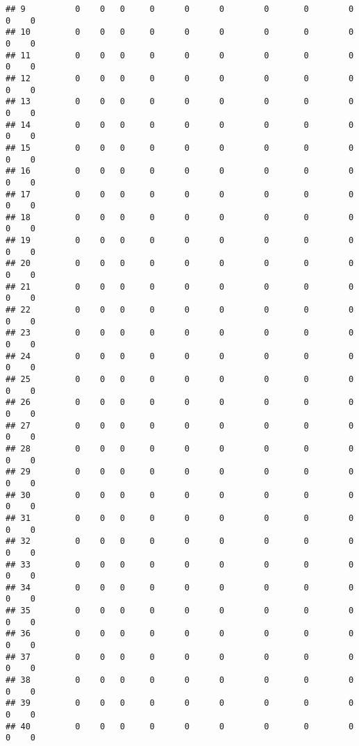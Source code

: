 \documentclass[
]{article}
\begin{document}
\begin{verbatim}
## 9          0    0   0     0      0      0        0       0        0     0    0
## 10         0    0   0     0      0      0        0       0        0     0    0
## 11         0    0   0     0      0      0        0       0        0     0    0
## 12         0    0   0     0      0      0        0       0        0     0    0
## 13         0    0   0     0      0      0        0       0        0     0    0
## 14         0    0   0     0      0      0        0       0        0     0    0
## 15         0    0   0     0      0      0        0       0        0     0    0
## 16         0    0   0     0      0      0        0       0        0     0    0
## 17         0    0   0     0      0      0        0       0        0     0    0
## 18         0    0   0     0      0      0        0       0        0     0    0
## 19         0    0   0     0      0      0        0       0        0     0    0
## 20         0    0   0     0      0      0        0       0        0     0    0
## 21         0    0   0     0      0      0        0       0        0     0    0
## 22         0    0   0     0      0      0        0       0        0     0    0
## 23         0    0   0     0      0      0        0       0        0     0    0
## 24         0    0   0     0      0      0        0       0        0     0    0
## 25         0    0   0     0      0      0        0       0        0     0    0
## 26         0    0   0     0      0      0        0       0        0     0    0
## 27         0    0   0     0      0      0        0       0        0     0    0
## 28         0    0   0     0      0      0        0       0        0     0    0
## 29         0    0   0     0      0      0        0       0        0     0    0
## 30         0    0   0     0      0      0        0       0        0     0    0
## 31         0    0   0     0      0      0        0       0        0     0    0
## 32         0    0   0     0      0      0        0       0        0     0    0
## 33         0    0   0     0      0      0        0       0        0     0    0
## 34         0    0   0     0      0      0        0       0        0     0    0
## 35         0    0   0     0      0      0        0       0        0     0    0
## 36         0    0   0     0      0      0        0       0        0     0    0
## 37         0    0   0     0      0      0        0       0        0     0    0
## 38         0    0   0     0      0      0        0       0        0     0    0
## 39         0    0   0     0      0      0        0       0        0     0    0
## 40         0    0   0     0      0      0        0       0        0     0    0

\end{verbatim}
\end{document}
